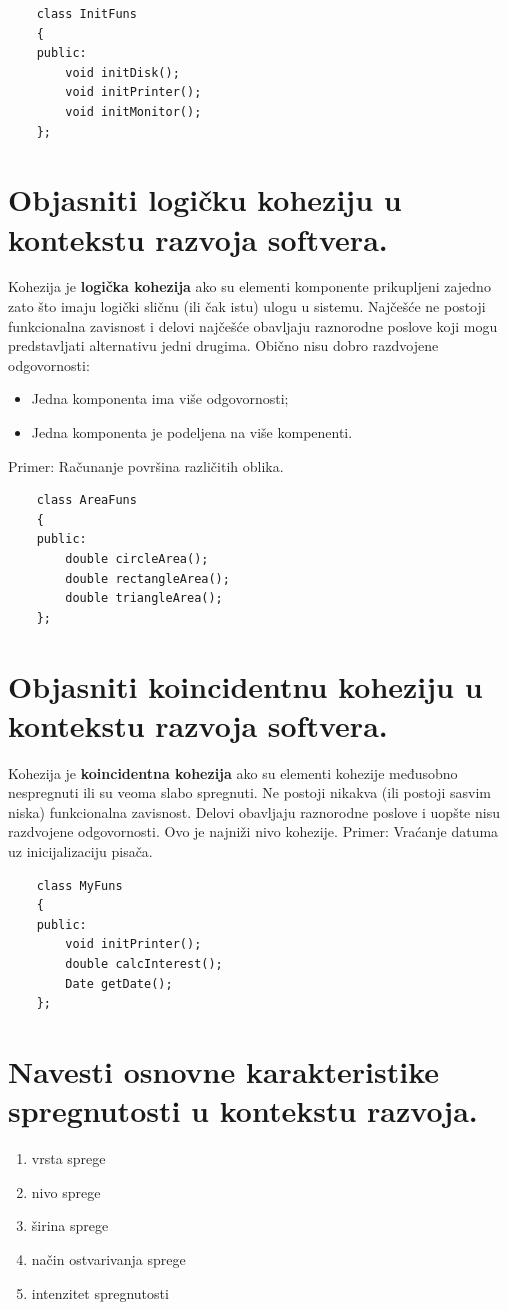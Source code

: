 \documentclass[a4paper]{article}
\begin{document}
  \begin{lstlisting}
    class InitFuns
    {
    public:
        void initDisk();
        void initPrinter();
        void initMonitor();
    };\end{lstlisting}

\section{Objasniti logičku koheziju u kontekstu razvoja softvera.}
  Kohezija je \textbf{logička kohezija} ako su elementi komponente prikupljeni zajedno zato što
  imaju logički sličnu (ili čak istu) ulogu u sistemu. Najčešće ne postoji funkcionalna
  zavisnost i delovi najčešće obavljaju raznorodne poslove koji mogu predstavljati alternativu
  jedni drugima. Obično nisu dobro razdvojene odgovornosti: 
  \begin{itemize}
    \item Jedna komponenta ima više odgovornosti;
    \item Jedna komponenta je podeljena na više kompenenti.
  \end{itemize}
  Primer: Računanje površina različitih oblika.

  \begin{lstlisting}
    class AreaFuns
    {
    public:
        double circleArea();
        double rectangleArea();
        double triangleArea();
    };\end{lstlisting}

\section{Objasniti koincidentnu koheziju u kontekstu razvoja softvera.}
  Kohezija je \textbf{koincidentna kohezija} ako su elementi kohezije međusobno nespregnuti 
  ili su veoma slabo spregnuti. 
  Ne postoji nikakva (ili postoji sasvim niska) funkcionalna zavisnost. Delovi obavljaju raznorodne
  poslove i uopšte nisu razdvojene odgovornosti. Ovo je najniži nivo kohezije.
  Primer: Vraćanje datuma uz inicijalizaciju pisača.
  
  \begin{lstlisting}
    class MyFuns
    {
    public:
        void initPrinter();
        double calcInterest();
        Date getDate();
    };\end{lstlisting}

\section{Navesti osnovne karakteristike spregnutosti u kontekstu razvoja.}
  \begin{enumerate}
    \item vrsta sprege
    \item nivo sprege
    \item širina sprege
    \item način ostvarivanja sprege
    \item intenzitet spregnutosti
  \end{enumerate}
\end{document}
